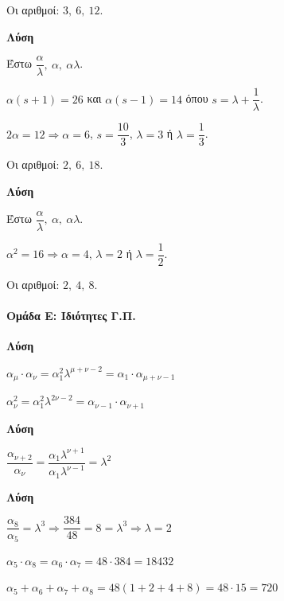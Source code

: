 \documentclass[11pt,a4paper,modern]{FFExercises}
\begin{document}
Οι αριθμοί: $3,\ 6,\ 12$.

\askhsh
\textbf{Λύση}

Έστω $\dfrac{\alpha}{\lambda},\ \alpha,\ \alpha\lambda$.

$\alpha(s + 1) = 26$ και $\alpha(s - 1) = 14$ όπου $s = \lambda + \dfrac{1}{\lambda}$.

$2\alpha = 12 \Rightarrow \alpha = 6$, $s = \dfrac{10}{3}$, $\lambda = 3$ ή $\lambda = \dfrac{1}{3}$.

Οι αριθμοί: $2,\ 6,\ 18$.

\askhsh
\textbf{Λύση}

Έστω $\dfrac{\alpha}{\lambda},\ \alpha,\ \alpha\lambda$.

$\alpha^2 = 16 \Rightarrow \alpha = 4$, $\lambda = 2$ ή $\lambda = \dfrac{1}{2}$.

Οι αριθμοί: $2,\ 4,\ 8$.


\paragraph{Ομάδα Ε: Ιδιότητες Γ.Π.}

\askhsh
\textbf{Λύση}
\begin{alist}
  \item $\alpha_\mu \cdot \alpha_\nu = \alpha_1^2 \lambda^{\mu+\nu-2} = \alpha_1 \cdot \alpha_{\mu+\nu-1}$ \checkmark
  
  \item $\alpha_\nu^2 = \alpha_1^2 \lambda^{2\nu-2} = \alpha_{\nu-1} \cdot \alpha_{\nu+1}$ \checkmark
\end{alist}

\askhsh
\textbf{Λύση}

$\dfrac{\alpha_{\nu+2}}{\alpha_\nu} = \dfrac{\alpha_1 \lambda^{\nu+1}}{\alpha_1 \lambda^{\nu-1}} = \lambda^2$

\askhsh
\textbf{Λύση}
\begin{alist}
  \item $\dfrac{\alpha_8}{\alpha_5} = \lambda^3 \Rightarrow \dfrac{384}{48} = 8 = \lambda^3 \Rightarrow \lambda = 2$
  
  \item $\alpha_5 \cdot \alpha_8 = \alpha_6 \cdot \alpha_7 = 48 \cdot 384 = 18432$
  
  \item $\alpha_5 + \alpha_6 + \alpha_7 + \alpha_8 = 48(1 + 2 + 4 + 8) = 48 \cdot 15 = 720$
\end{alist}
\end{document}

